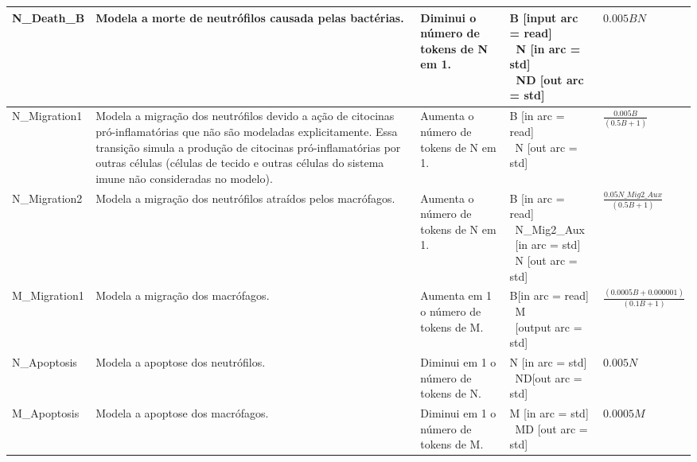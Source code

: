 \begin{center}
\begin{longtable}{
				>{\centering\arraybackslash}m{2cm}|
				m{4.23cm}|
				>{\centering\arraybackslash}m{3cm}|
				m{3cm}|
				>{\centering\arraybackslash}m{2.5cm}
			}
			
			N\_Death\_B & Modela a morte de neutrófilos causada pelas bactérias.  & 
			Diminui o número de tokens de N em 1.  & 
			\parbox{3cm}{B [input arc = read]\\\ N [in arc = std]\\\ ND [out arc = std]} & 
			$0.005  B  N$ \\ \hline
			
			
			N\_Migration1 & 
			Modela a migração dos neutrófilos devido a ação de citocinas pró-inflamatórias que não são modeladas explicitamente. 
			Essa transição simula a produção de citocinas pró-inflamatórias por outras células 
			(células de tecido e outras células do sistema imune não consideradas no modelo). & 
			Aumenta o número de tokens de N em 1.  & 
			\parbox{3cm}{B [in arc = read]\\\ N [out arc = std]} & 
			$\frac{0.005 B}{(0.5 B + 1)}$ \\ \hline
			
			
			N\_Migration2 & 
			Modela a migração dos neutrófilos atraídos pelos macrófagos. & 
			Aumenta o número de tokens de N em 1.  & 
			\vspace{-0.41cm} \parbox{3cm}{B [in arc = read]\\\  N\_Mig2\_Aux \\\ [in arc = std]\\\ N [out arc = std]} \vspace{0cm} & 
			$\frac{0.05 N\_Mig2\_Aux}{(0.5 B + 1)}$ \\ \hline
			
			M\_Migration1 & 
			Modela a migração dos macrófagos. & 
			Aumenta em 1 o número de tokens de M. & 
			\parbox{3cm}{B[in arc = read]\\\ M\\\ [output arc = std]} & 
			$\frac{(0.0005 B + 0.000001)}{(0.1 B + 1)}$ \\\hline
			
			N\_Apoptosis & 
			Modela a apoptose dos neutrófilos. & 
			Diminui em 1 o número de tokens de N. & 
			\parbox{3cm}{N [in arc = std]\\\ ND[out arc = std]} & 
			$0.005 N$ \\ \hline
			
			M\_Apoptosis & Modela a apoptose dos macrófagos. & 
			Diminui em 1 o número de tokens de M. & 
			\parbox{3cm}{M [in arc = std]\\\ MD [out arc = std]} & 
			$0.0005 M$ \\	\hline
			

\end{longtable}
\end{center}
